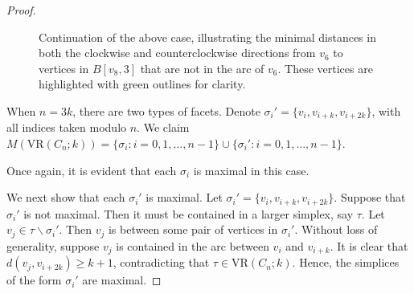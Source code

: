 \documentclass[12pt,a4paper]{amsart}
\theoremstyle{definition}
\newcommand{\vr}[2]{\mathrm{VR}(#1;#2)}
\numberwithin{equation}{section}
\begin{document}
\begin{proof}
\begin{figure}[h]
\begin{center}
\caption{Continuation of the above case, illustrating the minimal distances in both the clockwise and counterclockwise directions from $v_6$ to vertices in $B[v_8,3]$ that are not in the arc of $v_6$.
These vertices are highlighted with green outlines for clarity.}
\end{center}
\end{figure}


When $n=3k$, there are two types of facets.
Denote $\sigma_i'=\{v_i, v_{i+k}, v_{i+2k}\}$, with all indices taken modulo $n$.
We claim
$M(\vr{C_{n}}{k})=\{\sigma_i:i=0, 1,\ldots, n-1\} \cup \{\sigma_i': i=0, 1,\ldots, n-1\}$.

Once again, it is evident that each $\sigma_i$ is maximal in this case.

We next show that each $\sigma_i'$ is maximal.
Let $\sigma_i'=\{v_i, v_{i+k}, v_{i+2k}\}$.
Suppose that $\sigma_i'$ is not maximal.
Then it must be contained in a larger simplex, say $\tau$.
Let $v_j\in \tau\backslash\sigma_i'$.
Then $v_j$ is between some pair of vertices in $\sigma_i'$.
Without loss of generality, suppose $v_j$ is contained in the arc between $v_i$ and $v_{i+k}$.
It is clear that $d(v_j,v_{i+2k})\geq k+1$, contradicting that $\tau\in \vr{C_n}{k}$.
Hence, the simplices of the form $\sigma_i'$ are maximal.


\end{proof}
\end{document}
